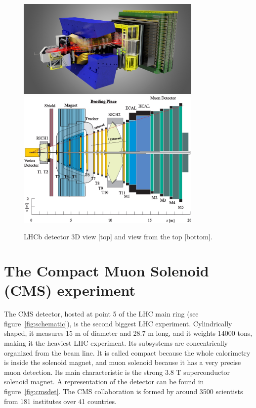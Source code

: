 \begin{figure}[!Hhtbp]
  \begin{center}
    \includegraphics[width=0.8\textwidth]{figs/LHCbDetectorlight1.jpg}
    \includegraphics[width=0.8\textwidth]{figs/LHCb_UpView.jpg}
    \caption{LHCb detector 3D view [top] and view from the top [bottom]. }
    \label{fig:lhcbdet}
  \end{center}
\end{figure}


\section{The Compact Muon Solenoid (CMS) experiment}
\label{sec:CMS}

The CMS detector, hosted at point 5 of the LHC main ring (see figure~\ref{fig:schematic}), is the second biggest LHC experiment. Cylindrically shaped, it measures 15 m of diameter and 28.7 m long, and it weights 14000 tons, making it the heaviest LHC experiment. Its subsystems are concentrically organized from the beam line. It is called compact because the whole calorimetry is inside the solenoid magnet, and muon solenoid because it has a very precise muon detection. Its main characteristic is the strong 3.8 T superconductor solenoid magnet. A representation of the detector can be found in figure~\ref{fig:cmsdet}. The CMS collaboration is formed by around 3500 scientists from 181 institutes over 41 countries. 

